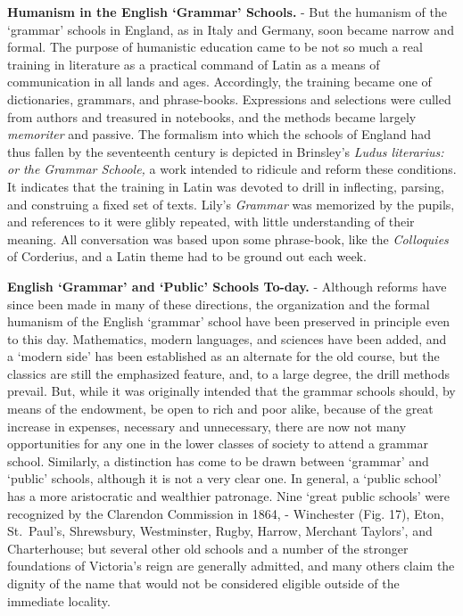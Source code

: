 \documentclass[
]{book}
\begin{document}
\textbf{Humanism in the English `Grammar' Schools.} - But the humanism of the `grammar' schools in England, as in Italy and Germany, soon became narrow and formal. The purpose of humanistic education came to be not so much a real training in literature as a practical command of Latin as a means of communication in all lands and ages. Accordingly, the training became one of dictionaries, grammars, and phrase-books. Expressions and selections were culled from authors and treasured in notebooks, and the methods became largely \emph{memoriter} and passive. The formalism into which the schools of England had thus fallen by the seventeenth century is depicted in Brinsley's \emph{Ludus literarius: or the Grammar Schoole,} a work intended to ridicule and reform these conditions. It indicates that the training in Latin was devoted to drill in inflecting, parsing, and construing a fixed set of texts. Lily's \emph{Grammar} was memorized by the pupils, and references to it were glibly repeated, with little understanding of their meaning. All conversation was based upon some phrase-book, like the \emph{Colloquies} of Corderius, and a Latin theme had to be ground out each week.

\textbf{English `Grammar' and `Public' Schools To-day.} - Although reforms have since been made in many of these directions, the organization and the formal humanism of the English `grammar' school have been preserved in principle even to this day. Mathematics, modern languages, and sciences have been added, and a `modern side' has been established as an alternate for the old course, but the classics are still the emphasized feature, and, to a large degree, the drill methods prevail. But, while it was originally intended that the grammar schools should, by means of the endowment, be open to rich and poor alike, because of the great increase in expenses, necessary and unnecessary, there are now not many opportunities for any one in the lower classes of society to attend a grammar school. Similarly, a distinction has come to be drawn between `grammar' and `public' schools, although it is not a very clear one. In general, a `public school' has a more aristocratic and wealthier patronage. Nine `great public schools' were recognized by the Clarendon Commission in 1864, - Winchester (Fig. 17), Eton, St.~Paul's, Shrewsbury, Westminster, Rugby, Harrow, Merchant Taylors', and Charterhouse; but several other old schools and a number of the stronger foundations of Victoria's reign are generally admitted, and many others claim the dignity of the name that would not be considered eligible outside of the immediate locality.
\end{document}
